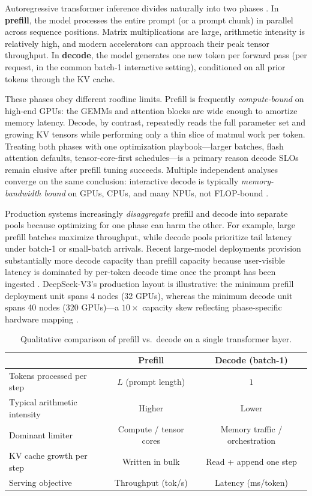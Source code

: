 Autoregressive transformer inference divides naturally into two phases \citep{patel2025llminference}.
In \textbf{prefill}, the model processes the entire prompt (or a prompt chunk) in parallel across sequence positions.
Matrix multiplications are large, arithmetic intensity is relatively high, and modern accelerators can approach their peak tensor throughput.
In \textbf{decode}, the model generates one new token per forward pass (per request, in the common batch-1 interactive setting), conditioned on all prior tokens through the KV cache.

These phases obey different roofline limits.
Prefill is frequently \emph{compute-bound} on high-end GPUs: the GEMMs and attention blocks are wide enough to amortize memory latency.
Decode, by contrast, repeatedly reads the full parameter set and growing KV tensors while performing only a thin slice of matmul work per token.
Treating both phases with one optimization playbook---larger batches, flash attention defaults, tensor-core-first schedules---is a primary reason decode SLOs remain elusive after prefill tuning succeeds.
Multiple independent analyses converge on the same conclusion: interactive decode is typically \emph{memory-bandwidth bound} on GPUs, CPUs, and many NPUs, not FLOP-bound \citep{patel2025llminference,memoryfloor2026}.

Production systems increasingly \emph{disaggregate} prefill and decode into separate pools because optimizing for one phase can harm the other.
For example, large prefill batches maximize throughput, while decode pools prioritize tail latency under batch-1 or small-batch arrivals.
Recent large-model deployments provision substantially more decode capacity than prefill capacity because user-visible latency is dominated by per-token decode time once the prompt has been ingested \citep{patel2025llminference,liu2024deepseekv3}.
DeepSeek-V3's production layout is illustrative: the minimum prefill deployment unit spans 4 nodes (32 GPUs), whereas the minimum decode unit spans 40 nodes (320 GPUs)---a $10\times$ capacity skew reflecting phase-specific hardware mapping \citep{liu2024deepseekv3}.

\begin{table}[t]
\centering
\caption{Qualitative comparison of prefill vs.\ decode on a single transformer layer.}
\label{tab:prefill_decode}
\begin{tabular}{lcc}
\toprule
 & \textbf{Prefill} & \textbf{Decode (batch-1)} \\
\midrule
Tokens processed per step & $L$ (prompt length) & $1$ \\
Typical arithmetic intensity & Higher & Lower \\
Dominant limiter & Compute / tensor cores & Memory traffic / orchestration \\
KV cache growth per step & Written in bulk & Read + append one step \\
Serving objective & Throughput (tok/s) & Latency (ms/token) \\
\bottomrule
\end{tabular}
\end{table}

